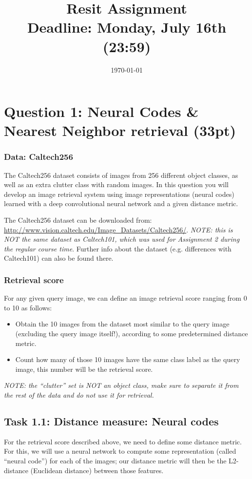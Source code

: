 \documentclass[a4paper,twoside,10pt]{article}
\title{\vspace{-\baselineskip}\sffamily\bfseries Resit Assignment \\
\large Deadline: Monday, July 16th (23:59)}
\date{\today}
\begin{document}
\maketitle

\section*{Question 1: Neural Codes \& Nearest Neighbor retrieval (33pt)}
\subsubsection*{Data: Caltech256}
The Caltech256 dataset consists of images from 256 different object classes, as well as an extra clutter class with random images. In this question you will develop an image retrieval system using image representations (neural codes) learned with a deep convolutional neural network and a given distance metric.

The Caltech256 dataset can be downloaded from: \url{http://www.vision.caltech.edu/Image_Datasets/Caltech256/}. \emph{NOTE: this is NOT the same dataset as Caltech101, which was used for Assignment 2 during the regular course time}. Further info about the dataset (e.g. differences with Caltech101) can also be found there.

\subsubsection*{Retrieval score}
For any given query image, we can define an image retrieval score ranging from 0 to 10 as follows:
\begin{itemize}
  \item Obtain the 10 images from the dataset most similar to the query image (excluding the query image itself!), according to some predetermined distance metric.
  \item Count how many of those 10 images have the same class label as the query image, this number will be the retrieval score.
\end{itemize}

\emph{NOTE: the ``clutter'' set is NOT an object class, make sure to separate it from the rest of the data and do not use it for retrieval.}


\subsection*{Task 1.1: Distance measure: Neural codes}
For the retrieval score described above, we need to define some distance metric. For this, we will use a neural network to compute some representation (called ``neural code'') for each of the images; our distance metric will then be the L2-distance (Euclidean distance) between those features.
\end{document}
